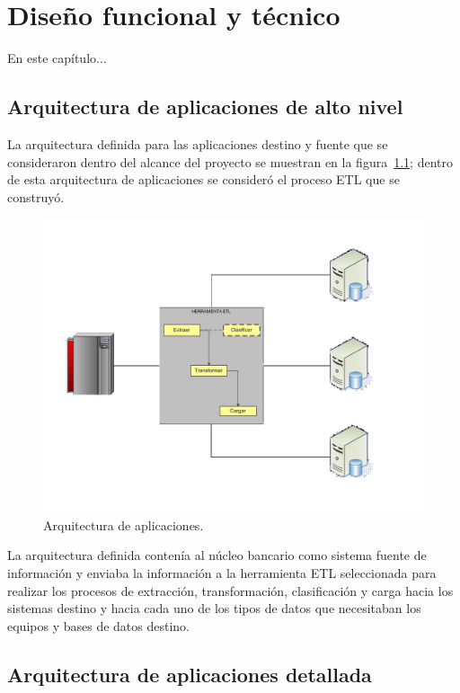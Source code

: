 \chapter{Diseño funcional y técnico}
\label{cap:diseno-funcional}

En este capítulo...

\section{Arquitectura de aplicaciones de alto nivel}

La arquitectura definida para las aplicaciones destino y fuente que se
consideraron dentro del alcance del proyecto se muestran en la
figura~\ref{fig:arquitectura}; dentro de esta arquitectura de aplicaciones se
consideró el proceso ETL que se construyó.

\begin{figure}[htb]
  \begin{center}
    \includegraphics[width=0.7\linewidth]{Arquitectura.jpg}
        \caption{Arquitectura de aplicaciones.}
    \label{fig:arquitectura}
  \end{center}
\end{figure}

La arquitectura definida contenía al núcleo bancario como sistema fuente de
información y enviaba la información a la herramienta ETL seleccionada para
realizar los procesos de extracción, transformación, clasificación y carga hacia
los sistemas destino y hacia cada uno de los tipos de datos que necesitaban los
equipos y bases de datos destino.

\section{Arquitectura de aplicaciones detallada}

